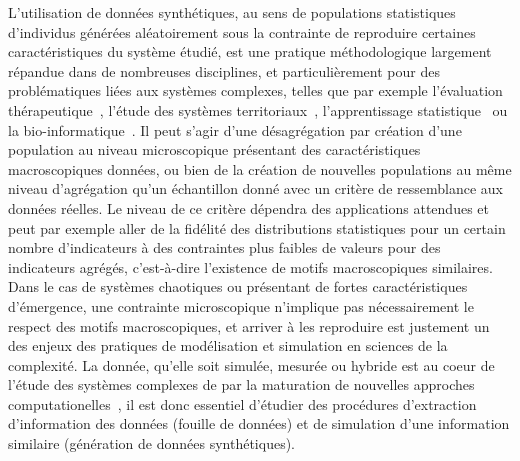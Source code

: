{L'utilisation de données synthétiques, au sens de populations statistiques d'individus générées aléatoirement sous la contrainte de reproduire certaines caractéristiques du système étudié, est une pratique méthodologique largement répandue dans de nombreuses disciplines, et particulièrement pour des problématiques liées aux systèmes complexes, telles que par exemple l'évaluation thérapeutique~\cite{abadie2010synthetic}, l'étude des systèmes territoriaux~\cite{moeckel2003creating,pritchard2009advances}, l'apprentissage statistique~\cite{bolon2013review} ou la bio-informatique~\cite{van2006syntren}. Il peut s'agir d'une désagrégation par création d'une population au niveau microscopique présentant des caractéristiques macroscopiques données, ou bien de la création de nouvelles populations au même niveau d'agrégation qu'un échantillon donné avec un critère de ressemblance aux données réelles. Le niveau de ce critère dépendra des applications attendues et peut par exemple aller de la fidélité des distributions statistiques pour un certain nombre d'indicateurs à des contraintes plus faibles de valeurs pour des indicateurs agrégés, c'est-à-dire l'existence de motifs macroscopiques similaires. Dans le cas de systèmes chaotiques ou présentant de fortes caractéristiques d'émergence, une contrainte microscopique n'implique pas nécessairement le respect des motifs macroscopiques, et arriver à les reproduire est justement un des enjeux des pratiques de modélisation et simulation en sciences de la complexité. La donnée, qu'elle soit simulée, mesurée ou hybride est au coeur de l'étude des systèmes complexes de par la maturation de nouvelles approches computationelles~\cite{arthur2015complexity}, il est donc essentiel d'étudier des procédures d'extraction d'information des données (fouille de données) et de simulation d'une information similaire (génération de données synthétiques).
}




